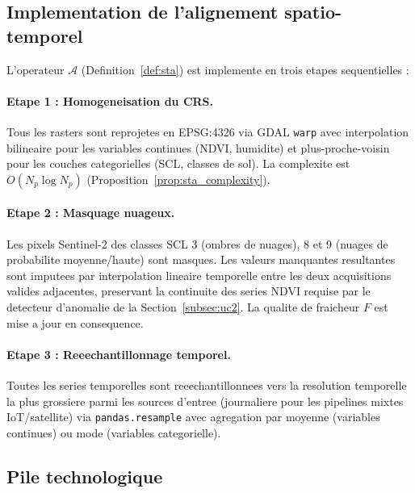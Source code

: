 \documentclass[12pt,a4paper]{article}
\theoremstyle{plain}
\theoremstyle{definition}
\theoremstyle{remark}
\begin{document}
\subsection{Implementation de l'alignement spatio-temporel}
\label{subsec:alignment_impl}

L'operateur $\mathcal{A}$ (Definition~\ref{def:sta}) est implemente
en trois etapes sequentielles :

\paragraph{Etape 1 : Homogeneisation du CRS.}
Tous les rasters sont reprojetes en EPSG:4326 via GDAL \texttt{warp}
avec interpolation bilineaire pour les variables continues (NDVI, humidite)
et plus-proche-voisin pour les couches categorielles (SCL, classes de sol).
La complexite est $O(N_p \log N_p)$
(Proposition~\ref{prop:sta_complexity}).

\paragraph{Etape 2 : Masquage nuageux.}
Les pixels Sentinel-2 des classes SCL 3 (ombres de nuages), 8 et 9
(nuages de probabilite moyenne/haute) sont masques. Les valeurs
manquantes resultantes sont imputees par interpolation lineaire
temporelle entre les deux acquisitions valides adjacentes, preservant
la continuite des series NDVI requise par le detecteur d'anomalie
de la Section~\ref{subsec:uc2}. La qualite de fraicheur $F$ est
mise a jour en consequence.

\paragraph{Etape 3 : Reeechantillonnage temporel.}
Toutes les series temporelles sont reeechantillonnees vers la
resolution temporelle la plus grossiere parmi les sources d'entree
(journaliere pour les pipelines mixtes IoT/satellite) via
\texttt{pandas.resample} avec agregation par moyenne (variables continues)
ou mode (variables categorielle).

\subsection{Pile technologique}
\end{document}
